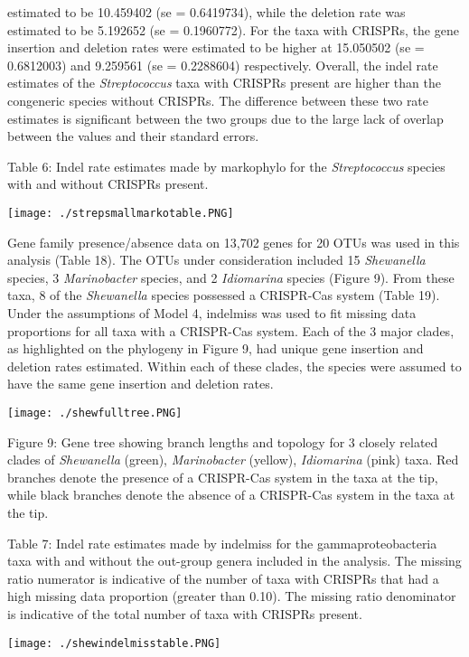 \documentclass[english]{article}
\begin{document}
estimated to be 10.459402 (se = 0.6419734), while the deletion rate
was estimated to be 5.192652 (se = 0.1960772). For the taxa with
CRISPRs, the gene insertion and deletion rates were estimated to be
higher at 15.050502 (se = 0.6812003) and 9.259561 (se = 0.2288604)
respectively. Overall, the indel rate estimates of the
\textit{Streptococcus}
taxa with CRISPRs present are higher than the congeneric species
without CRISPRs.  The difference between these two rate estimates is
significant between the two groups due to the large lack
of overlap between the values and their standard errors. 
\singlespacing
\caption{Table 6: Indel rate estimates made by markophylo for the
\textit{Streptococcus} species with and without CRISPRs present.}
\newline
\texttt{[image: ./strepsmallmarkotable.PNG]}
\singlespacing


Gene family presence/absence data on 13,702 genes for 20 OTUs was used
in this analysis (Table 18).  The  OTUs  under  consideration  included
15 \textit{Shewanella} species, 3 \textit{Marinobacter}  species, and  
2 \textit{Idiomarina}
species (Figure  9).  From  these  taxa, 8 of the \textit{Shewanella} species
possessed a CRISPR-Cas system (Table 19).  Under the assumptions  of
Model 4, indelmiss was used to fit missing data  proportions  for all
taxa with a CRISPR-Cas system.  Each of the 3 major clades, as
highlighted on the phylogeny in Figure 9, had unique gene insertion
and deletion rates estimated.  Within each of these clades, the
species were assumed to have the same gene insertion and deletion
rates.

\singlespacing
\texttt{[image: ./shewfulltree.PNG]}
\caption{Figure 9: Gene tree showing branch lengths and topology for 3
closely related clades of \textit{Shewanella} (green),
\textit{Marinobacter} (yellow),
\textit{Idiomarina} (pink) taxa. Red branches denote the presence of
a CRISPR-Cas system in the taxa at the tip, while black branches
denote the absence of a CRISPR-Cas system in the taxa at the tip.}
\singlespacing
\caption{Table 7: Indel rate estimates made by indelmiss for the
gammaproteobacteria taxa with and without the out-group genera
included in the analysis. The missing ratio numerator is indicative of
the number of taxa with CRISPRs that had a high missing data
proportion (greater than 0.10).  The missing ratio denominator is
indicative of the total number of taxa with CRISPRs present.}
\newline
\texttt{[image: ./shewindelmisstable.PNG]}
\singlespacing
\end{document}
